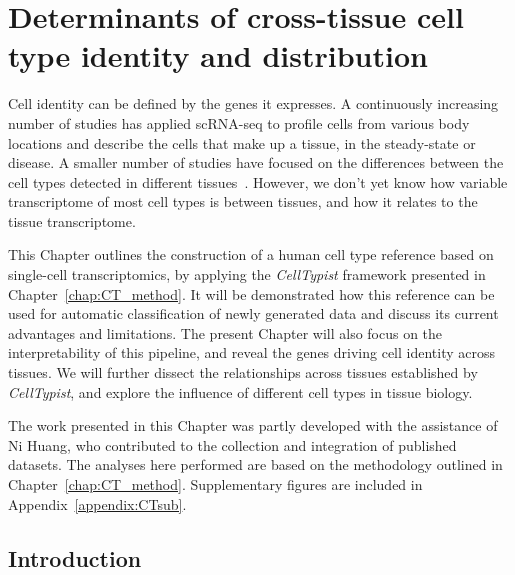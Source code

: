 \chapter{Determinants of cross-tissue cell type identity and distribution} \label{chap:CT_bio}

\ifpdf
    \graphicspath{{Chapter4/Figs/Raster/}{Chapter4/Figs/PDF/}{Chapter4/Figs/}}
\else
    \graphicspath{{Chapter4/Figs/Vector/}{Chapter4/Figs/}}
\fi
Cell identity can be defined by the genes it expresses. A continuously increasing number of studies has applied scRNA-seq to profile cells from various body locations and describe the cells that make up a tissue, in the steady-state or disease. A smaller number of studies have focused on the differences between the cell types detected in different tissues~\citep{miragaia_single-cell_2019,scott_transcription_2018}. However, we don't yet know how variable transcriptome of most cell types is between tissues, and how it relates to the tissue transcriptome.

This Chapter outlines the construction of a human cell type reference based on single-cell transcriptomics, by applying the \textit{CellTypist} framework presented in Chapter~\ref{chap:CT_method}. It will be demonstrated how this reference can be used for automatic classification of newly generated data and discuss its current advantages and limitations. The present Chapter will also focus on the interpretability of this pipeline, and reveal the genes driving cell identity across tissues. We will further dissect the relationships across tissues established by \textit{CellTypist}, and explore the influence of different cell types in tissue biology.

The work presented in this Chapter was partly developed with the assistance of Ni Huang, who contributed to the collection and integration of published datasets. The analyses here performed are based on the methodology outlined in Chapter~\ref{chap:CT_method}. Supplementary figures are included in Appendix~\ref{appendix:CTsub}.


\section{Introduction}
\label{section4.1}




